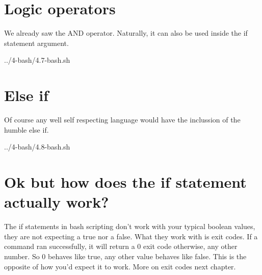 \section{Logic operators}

We already saw the AND operator. Naturally, it can also be used inside the if statement argument.


{../4-bash/4.7-bash.sh}

\section{Else if}

Of course any well self respecting language would have the inclussion of the humble else if.


{../4-bash/4.8-bash.sh}


\section{Ok but how does the if statement actually work?}

The if statements in bash scripting don't work with your typical boolean values, they are not expecting
a true nor a false. What they work with is exit codes. If a command ran successfully, it will return a 0 exit code
otherwise, any other number. So 0 behaves like true, any other value behaves like false. This is the 
opposite of how you'd expect it to work. More on exit codes next chapter.